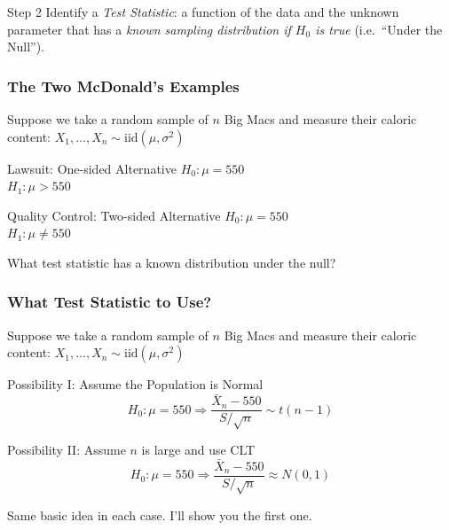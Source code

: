 \documentclass[handout]{beamer}
\begin{document}

\begin{frame}
\begin{alertblock}{Step 2}
Identify a \emph{Test Statistic}: a function of the data and the unknown parameter that has a \emph{known sampling distribution if $H_0$ is true} (i.e.\ ``Under the Null'').
\end{alertblock}
\end{frame}


\begin{frame}
\frametitle{The Two McDonald's Examples}
Suppose we take a random sample of $n$ Big Macs and measure their caloric content: $X_1, \hdots, X_n \sim \mbox{iid} (\mu, \sigma^2)$

\begin{block}{Lawsuit: One-sided Alternative}
$H_0\colon \mu = 550$\\
$H_1\colon \mu > 550$
\end{block}
\begin{block}{Quality Control: Two-sided Alternative}
$H_0\colon \mu = 550$\\
$H_1\colon \mu \neq 550$
\end{block}
\alert{What test statistic has a known distribution under the null?}
\end{frame}

\begin{frame}
\frametitle{What Test Statistic to Use?}
Suppose we take a random sample of $n$ Big Macs and measure their caloric content: $X_1, \hdots, X_n \sim \mbox{iid} (\mu, \sigma^2)$

\begin{block}{Possibility I: Assume the Population is Normal}
 $$H_0\colon \mu = 550 \Rightarrow \displaystyle \frac{\bar{X}_n - 550}{S/\sqrt{n}}\sim t(n-1)$$
\end{block}

\begin{block}{Possibility II: Assume $n$ is large and use CLT}
 $$H_0\colon \mu = 550 \Rightarrow \displaystyle \frac{\bar{X}_n - 550}{S/\sqrt{n}}\approx N(0,1)$$
\end{block}

\alert{Same basic idea in each case. I'll show you the first one.}
\end{frame}


\end{document}
